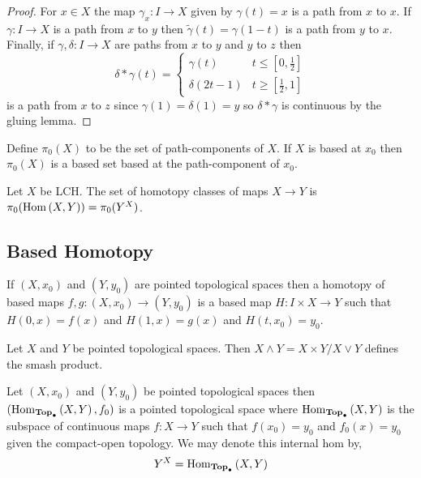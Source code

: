 \documentclass[12pt]{extarticle}
\begin{document}
\begin{proof}
For $x \in X$ the map $\gamma_x : I \to X$ given by $\gamma(t) = x$ is a path from $x$ to $x$. If $\gamma : I \to X$ is a path from $x$ to $y$ then $\tilde{\gamma}(t) = \gamma(1-t)$ is a path from $y$ to $x$. Finally, if $\gamma, \delta : I \to X$ are paths from $x$ to $y$ and $y$ to $z$ then
\[ \delta * \gamma(t) = 
\begin{cases}
\gamma(t) & t \le [0, \tfrac{1}{2} ]
\\
\delta(2t - 1) & t \ge [\tfrac{1}{2}, 1] 
\end{cases}
\]
is a path from $x$ to $z$ since $\gamma(1) = \delta(1) = y$ so $\delta * \gamma$ is continuous by the gluing lemma. 
\end{proof}

\begin{definition}
Define $\pi_0(X)$ to be the set of path-components of $X$. If $X$ is based at $x_0$ then $\pi_0(X)$ is a based set based at the path-component of $x_0$.
\end{definition}

\begin{proposition}
Let $X$ be LCH. The set of homotopy classes of maps $X \to Y$ is $\pi_0(\mathrm{Hom}\left( X, Y \right)) = \pi_0(Y^X)$. 
\end{proposition}


\subsection{Based Homotopy}

\begin{definition}
If $(X, x_0)$ and $(Y, y_0)$ are pointed topological spaces then a homotopy of based maps $f, g : (X, x_0) \to (Y, y_0)$ is a based map $H : I \times X \to Y$ such that $H(0, x) = f(x)$ and $H(1, x) = g(x)$ and $H(t, x_0) = y_0$.
\end{definition}

\begin{definition}
Let $X$ and $Y$ be pointed topological spaces. Then $X \wedge Y =  X \times Y / X \vee Y$ defines the smash product.
\end{definition}

\begin{definition}
Let $(X, x_0)$ and $(Y, y_0)$ be pointed topological spaces then $(\mathrm{Hom}_{\mathbf{Top}_{\bullet}}\left( X, Y \right), f_0)$ is a pointed topological space where $\mathrm{Hom}_{\mathbf{Top}_{\bullet}}\left( X, Y \right)$ is the subspace of continuous maps $f : X \to Y$ such that $f(x_0) = y_0$ and $f_0(x) = y_0$ given the compact-open topology. We may denote this internal hom by, 
\[ Y^X = \mathrm{Hom}_{\mathbf{Top}_{\bullet}}\left( X, Y \right)\]  
\end{definition}
\end{document}
